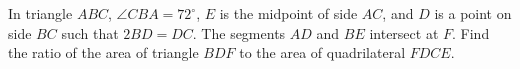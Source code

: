 In triangle $ABC$, $\angle CBA=72^\circ$, $E$ is the midpoint of side $AC$, and $D$ is a point on side $BC$ such that $2BD=DC$. The segments $AD$ and $BE$ intersect at $F$. Find the ratio of the area of triangle $BDF$ to the area of quadrilateral $FDCE$.
